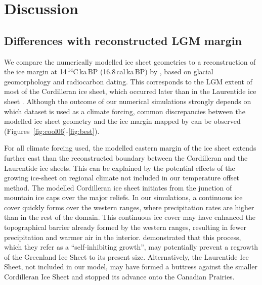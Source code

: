 \section{Discussion}
\label{sec:discussion}

\subsection{Differences with reconstructed LGM margin}

We compare the numerically modelled ice sheet geometries to a reconstruction of the ice margin at 14\,$^{14}$C\,ka\,BP (16.8\,cal\,ka\,BP) by \citet{dyke-2004}, based on glacial geomorphology and radiocarbon dating. This corresponds to the LGM extent of most of the Cordilleran ice sheet, which occurred later than in the Laurentide ice sheet \citep{dyke-2004}.
Although the outcome of our numerical simulations strongly depends on which dataset is used as a climate forcing, common discrepancies between the modelled ice sheet geometry and the ice margin mapped by \citet{dyke-2004} can be observed (Figures~\ref{fig:cool06}-\ref{fig:best}).

For all climate forcing used, the modelled eastern margin of the ice sheet extends further east than the reconstructed boundary between the Cordilleran and the Laurentide ice sheets. This can be explained by the potential effects of the growing ice-sheet on regional climate not included in our temperature offset method. The modelled Cordilleran ice sheet initiates from the junction of mountain ice caps over the major reliefs. In our simulations, a continuous ice cover quickly forms over the western ranges, where precipitation rates are higher than in the rest of the domain. This continuous ice cover may have enhanced the topographical barrier already formed by the western ranges, resulting in fewer precipitation and warmer air in the interior. \citet{langen-etal-2012} demonstrated that this process, which they refer as a ``self-inhibiting growth'', may potentially prevent a regrowth of the Greenland Ice Sheet to its present size. Alternatively, the Laurentide Ice Sheet, not included in our model, may have formed a buttress against the smaller Cordilleran Ice Sheet and stopped its advance onto the Canadian Prairies.

